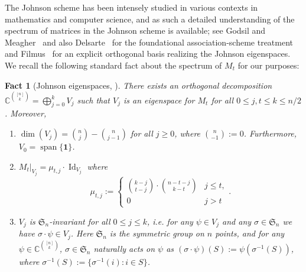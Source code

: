 \documentclass
[11pt,letterpaper]
{article}
\newtheorem{fact}[theorem]{Fact}
\theoremstyle{definition}
\newcommand{\1}{\mathbf{1}}
\newcommand{\C}{\mathbb C}
\newcommand{\Id}{\operatorname{Id}}
\newcommand{\spn}{\operatorname{span}}
\renewcommand{\geq}{\geqslant}
\renewcommand{\leq}{\leqslant}
\begin{document}
The Johnson scheme has been intensely studied in various contexts in mathematics and computer science, and as such a detailed understanding of the spectrum of matrices in the Johnson scheme is available; see Godsil and Meagher~\cite[Chapter 6]{godsil2015erdos} and also Delsarte~\cite{delsarte1973algebraic} for the foundational association-scheme treatment and Filmus~\cite{Filmus16} for an explicit orthogonal basis realizing the Johnson eigenspaces. We recall the following standard fact about the spectrum of $M_t$ for our purposes:
\begin{fact}[Johnson eigenspaces, \cite{delsarte1973algebraic,Wilson90}]\label{fact:johnson-eigenspaces}
    There exists an orthogonal decomposition $\C^{\binom{[n]}{k}} = \bigoplus_{j = 0}^k V_j$ such that $V_j$ is an eigenspace for $M_t$ for all $0\leq j, t\leq k\leq n/2$. Moreover,
    \begin{enumerate}[(1)]
        \item $\dim(V_j) = \binom{n}{j} - \binom{n}{j - 1}$ for all $j\geq 0$, where $\binom{n}{-1}:= 0$. Furthermore, $V_0 = \spn\{\1\}$.
        \item $M_t\vert_{V_j} = \mu_{t, j}\cdot\Id_{V_j}$ where 
        \[\mu_{t, j}:= \begin{cases}
        \binom{k - j}{t - j}\cdot\binom{n - t - j}{k - t} & j\leq t,\\
            0 & j > t
        \end{cases}.\]
        \item $V_j$ is $\mathfrak{S}_n$-invariant for all $0\leq j\leq k$, i.e. for any $\psi\in V_j$ and any $\sigma\in\mathfrak{S}_n$ we have $\sigma\cdot\psi\in V_j$. Here $\mathfrak{S}_n$ is the symmetric group on $n$ points, and for any $\psi\in\C^{\binom{[n]}{k}}$, $\sigma\in \mathfrak{S}_n$ naturally acts on $\psi$ as $(\sigma\cdot\psi)(S):= \psi(\sigma^{-1}(S))$, where $\sigma^{-1}(S):= \{\sigma^{-1}(i): i\in S\}$. 
    \end{enumerate}
\end{fact}
\end{document}
